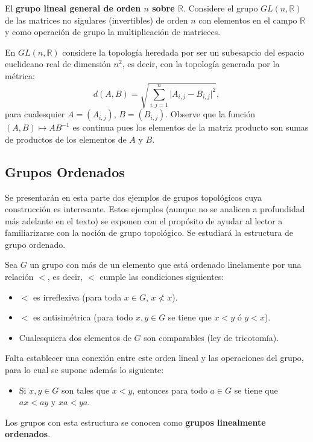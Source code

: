 \documentclass[12pt]{report}
\theoremstyle{largebreak}
\newcommand\abs[1]{\ensuremath{\lvert#1\rvert}}
\begin{document}
    \begin{exa}
        El \textbf{grupo lineal general de orden $n$ sobre $\mathbb{R}$}. Considere el grupo $GL(n,\mathbb{R})$ de las matrices no sigulares (invertibles) de orden $n$ con elementos en el campo $\mathbb{R}$ y como operación de grupo la multiplicación de matricecs.

        En $GL(n,\mathbb{R})$ considere la topología heredada por ser un subesapcio del espacio euclideano real de dimensión $n^2$, es decir, con la topología generada por la métrica:
        \begin{equation*}
            d(A,B)=\sqrt{\sum_{i,j=1}^n\abs{A_{i,j}-B_{i,j}}^2},
        \end{equation*}
        para cualesquier $A=\left(A_{i,j}\right)$, $B=\left(B_{i,j}\right)$. Observe que la función $(A,B)\mapsto AB^{-1}$ es continua pues los elementos de la matriz producto son sumas de productos de los elementos de $A$ y $B$.
    \end{exa}

    \subsection{Grupos Ordenados}

    Se presentarán en esta parte dos ejemplos de grupos topológicos cuya construcción es interesante. Estos ejemplos (aunque no se analicen a profundidad más adelante en el texto) se exponen con el propósito de ayudar al lector a familiarizarse con la noción de grupo topológico. Se estudiará la estructura de grupo ordenado.

    Sea $G$ un grupo con más de un elemento que está ordenado linelamente por una relación $<$, es decir, $<$ cumple las condiciones siguientes:
    \begin{itemize}
        \item $<$ es irreflexiva (para toda $x\in G$, $x\nless x$).
        \item $<$ es antisimétrica (para todo $x,y\in G$ se tiene que $x<y$ ó $y<x$).
        \item Cualesquiera dos elementos de $G$ son comparables (ley de tricotomía).
    \end{itemize}
    Falta establecer una conexión entre este orden lineal y las operaciones del grupo, para lo cual se supone además lo siguiente:
    \begin{itemize}
        \item Si $x,y\in G$ son tales que $x<y$, entonces para todo $a\in G$ se tiene que $ax<ay$ y $xa<ya$.
    \end{itemize}
    Los grupos con esta estructura se conocen como \textbf{grupos linealmente ordenados}.
\end{document}
